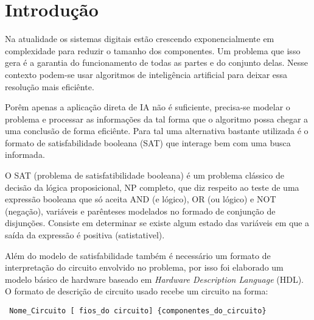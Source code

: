 \section{Introdução}
\label{sec:introducao}

Na atualidade os sistemas digitais estão crescendo exponencialmente em complexidade para reduzir o tamanho dos componentes. Um problema que isso gera é a garantia do funcionamento de todas as partes e do conjunto delas. Nesse contexto podem-se usar algoritmos de inteligência artificial para deixar essa resolução mais eficiênte.

Porêm apenas a aplicação direta de IA não é suficiente, precisa-se modelar o problema e processar as informações da tal forma que o algoritmo possa chegar a uma conclusão de forma eficiênte. Para tal uma alternativa bastante utilizada é o formato de satisfabilidade booleana (SAT) que interage bem com uma busca informada. 

O SAT (problema de satisfatibilidade booleana) é um problema clássico de decisão da lógica proposicional, NP completo, que diz respeito ao teste de uma expressão booleana que só aceita AND (e lógico), OR (ou lógico) e NOT (negação), variáveis e parênteses modelados no formado de conjunção de disjunções. Consiste em determinar se existe algum estado das variáveis em que a saída da expressão é positiva (satistativel).

Além do modelo de satisfabilidade também é necessário um formato de interpretação do circuito envolvido no problema, por isso foi elaborado um modelo básico de hardware baseado em \textit{Hardware Description Language} (HDL). O formato de descrição de circuito usado recebe um circuito na forma:
\begin{lstlisting}
 Nome_Circuito [ fios_do circuito] {componentes_do_circuito}
\end{lstlisting}
